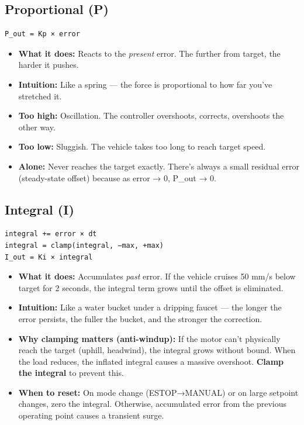 \documentclass[12pt,a4paper,oneside]{report}
\providecommand{\tightlist}{\setlength{\itemsep}{0pt}\setlength{\parskip}{0pt}}
\begin{document}
\subsection{Proportional (P)}\label{proportional-p}

\begin{verbatim}
P_out = Kp × error
\end{verbatim}

\begin{itemize}
\tightlist
\item
  \textbf{What it does:} Reacts to the \emph{present} error. The further from
  target, the harder it pushes.
\item
  \textbf{Intuition:} Like a spring --- the force is proportional to how far
  you've stretched it.
\item
  \textbf{Too high:} Oscillation. The controller overshoots, corrects,
  overshoots the other way.
\item
  \textbf{Too low:} Sluggish. The vehicle takes too long to reach target speed.
\item
  \textbf{Alone:} Never reaches the target exactly. There's always a small
  residual error (steady-state offset) because as error → 0, P\_out → 0.
\end{itemize}

\subsection{Integral (I)}\label{integral-i}

\begin{verbatim}
integral += error × dt
integral = clamp(integral, −max, +max)
I_out = Ki × integral
\end{verbatim}

\begin{itemize}
\tightlist
\item
  \textbf{What it does:} Accumulates \emph{past} error. If the vehicle cruises
  50 mm/s below target for 2 seconds, the integral term grows until the offset
  is eliminated.
\item
  \textbf{Intuition:} Like a water bucket under a dripping faucet --- the longer
  the error persists, the fuller the bucket, and the stronger the correction.
\item
  \textbf{Why clamping matters (anti-windup):} If the motor can't physically
  reach the target (uphill, headwind), the integral grows without bound. When
  the load reduces, the inflated integral causes a massive overshoot.
  \textbf{Clamp the integral} to prevent this.
\item
  \textbf{When to reset:} On mode change (ESTOP→MANUAL) or on large setpoint
  changes, zero the integral. Otherwise, accumulated error from the previous
  operating point causes a transient surge.
\end{itemize}
\end{document}
